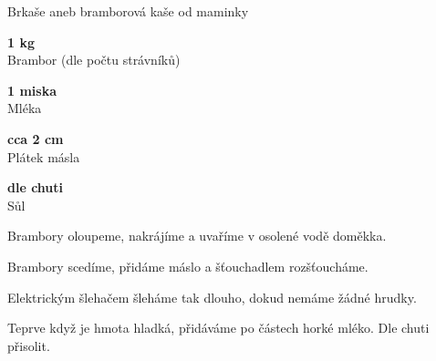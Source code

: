 \documentclass[11pt,a4paper]{article}
\begin{document}
\begin{recipe}[Gold]{Brkaše aneb bramborová kaše od maminky}
    \begin{ingredients}
        \item \parbox[t]{\linewidth}{\raggedright \weight \textbf{1 kg}\\ Brambor (dle počtu strávníků)}
        \item \parbox[t]{\linewidth}{\raggedright \liquid \textbf{1 miska}\\ Mléka}
        \item \parbox[t]{\linewidth}{\raggedright \piece \textbf{cca 2 cm}\\ Plátek másla}
        \item \parbox[t]{\linewidth}{\raggedright \indefinite \textbf{dle chuti}\\ Sůl}
    \end{ingredients}
    \begin{steps}
        \item Brambory oloupeme, nakrájíme a uvaříme v osolené vodě doměkka.
        \item Brambory scedíme, přidáme máslo a šťouchadlem rozšťoucháme.
        \item Elektrickým šlehačem šleháme tak dlouho, dokud nemáme žádné hrudky.
        \item Teprve když je hmota hladká, přidáváme po částech horké mléko. Dle chuti přisolit.
    \end{steps}
\end{recipe}
\end{document}
